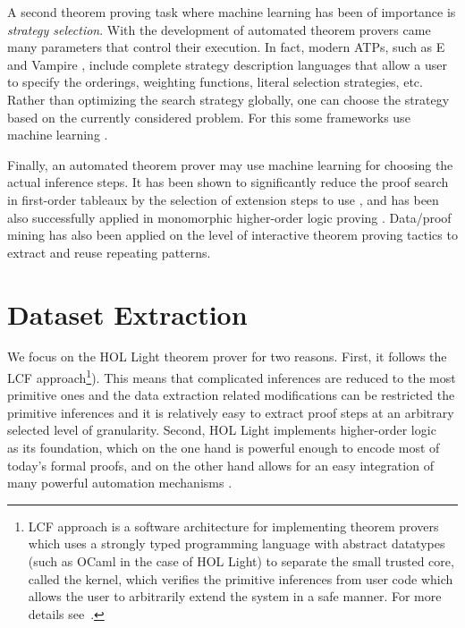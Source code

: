\documentclass[]{article}
\begin{document}
A second theorem proving task where machine learning has been of
importance is \emph{strategy selection}. With the development of
automated theorem provers came many parameters that control their
execution. In fact, modern ATPs, such as E \citep{eprover} and
Vampire \citep{vampire}, include complete strategy description languages
that allow a user to specify the orderings, weighting functions, literal
selection strategies, etc. Rather than optimizing the search strategy
globally, one can choose the strategy based on the currently considered
problem. For this some frameworks use machine learning
\citep{learnheuristic,males}.

Finally, an automated theorem prover may use machine learning for
choosing the actual inference steps.
It has been shown to significantly reduce the proof
search in first-order tableaux by the selection of extension steps to
use \citep{malecop}, and has been also successfully applied in
monomorphic higher-order logic proving \citep{mllax}. Data/proof mining
has also been applied on the level of interactive theorem proving
tactics \citep{hazelduncan} to extract and reuse repeating patterns.



\section{Dataset Extraction}\label{s:extraction}

We focus on the HOL Light theorem prover for
two reasons. First, it follows the LCF approach\footnote{LCF approach is
a software architecture for implementing theorem provers which uses a
strongly typed programming language with abstract datatypes (such as
OCaml in the case of HOL Light) to separate the small trusted core,
called the kernel, which
verifies the primitive inferences from user code which allows the user
to arbitrarily extend the system in a safe manner. For more details
see~\citep{edin-lcf}.}). This means that complicated inferences are
reduced to the most primitive ones and the data extraction related
modifications can be restricted the primitive inferences and it is
relatively easy to extract proof steps at
an arbitrary selected level of granularity. Second, HOL Light implements
higher-order logic~\citep{churchhol} as its foundation,
which on the one hand is powerful
enough to encode most of today's formal proofs, and on the other hand
allows for an easy integration of many powerful automation mechanisms
\citep{baadernipkow,blast}.
\end{document}
